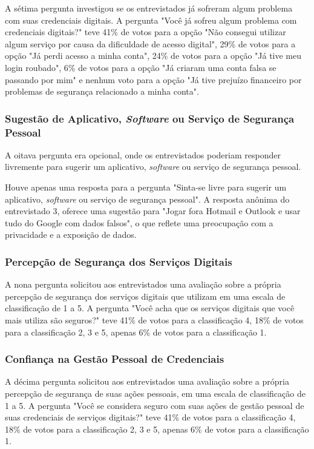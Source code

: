 \documentclass[12pt]{article}
\begin{document}
A sétima pergunta investigou se os entrevistados já sofreram algum problema com suas
credenciais digitais.
A pergunta "Você já sofreu algum problema com credenciais digitais?" teve 41\% de votos
para a opção "Não consegui utilizar algum serviço por causa da dificuldade de acesso
digital", 29\% de votos para a opção "Já perdi acesso a minha conta", 24\% de votos para a
opção "Já tive meu login roubado", 6\% de votos para a opção "Já criaram uma conta falsa
se passando por mim" e nenhum voto para a opção "Já tive prejuízo financeiro por problemas
de segurança relacionado a minha conta".

\subsubsection{Sugestão de Aplicativo, \textit{Software} ou Serviço de Segurança Pessoal}

A oitava pergunta era opcional, onde os entrevistados poderiam responder livremente para
sugerir um aplicativo, \textit{software} ou serviço de segurança pessoal.

Houve apenas uma resposta para a pergunta "Sinta-se livre para sugerir um aplicativo,
\textit{software} ou serviço de segurança pessoal".
A resposta anônima do entrevistado 3, oferece uma sugestão para "Jogar fora Hotmail
e Outlook e usar tudo do Google com dados falsos", o que reflete uma preocupação com a
privacidade e a exposição de dados.

\subsubsection{Percepção de Segurança dos Serviços Digitais}

A nona pergunta solicitou aos entrevistados uma avaliação sobre a própria percepção de
segurança dos serviços digitais que utilizam em uma escala de classificação de 1 a 5.
A pergunta "Você acha que os serviços digitais que você mais utiliza são seguros?" teve 
41\% de votos para a classificação 4, 18\% de votos para a classificação 2, 3 e 5,
apenas 6\% de votos para a classificação 1.

\subsubsection{Confiança na Gestão Pessoal de Credenciais}

A décima pergunta solicitou aos entrevistados uma avaliação sobre a própria percepção de
segurança de suas ações pessoais, em uma escala de classificação de 1 a 5.
A pergunta "Você se considera seguro com suas ações de gestão pessoal de suas credenciais
de serviços digitais?" teve 41\% de votos para a classificação 4, 18\% de votos para a
classificação 2, 3 e 5, apenas 6\% de votos para a classificação 1.
\end{document}

